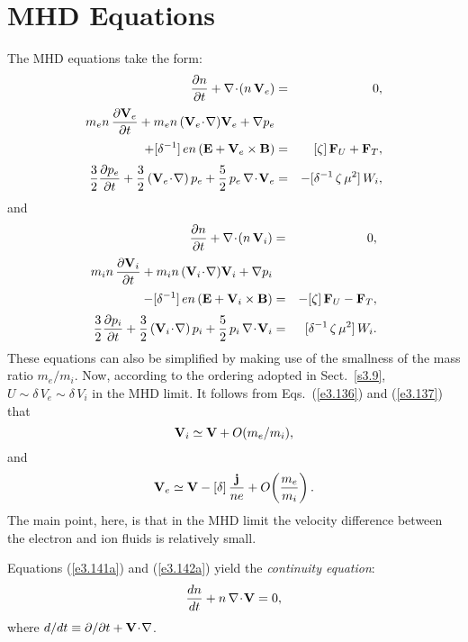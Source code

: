 \section{MHD Equations}
The MHD equations take the form:
\begin{eqnarray}\label{e3.141a}
\frac{\partial n}{\partial t} + \nabla\!\cdot\!(n\,{\bf V}_e) &=& 0,\\[0.5ex]
\label{e3.141b}
m_e n\,\frac{\partial  {\bf V}_e}{\partial t} +
m_e n\,({\bf V}_e\!\cdot\!\nabla){\bf V}_e+
 \nabla p_e\\[0.5ex]
+   [\delta^{-1}]\,e n\,
({\bf E} + {\bf V}_e\times {\bf B})& =& [\zeta]\,{\bf F}_U + {\bf F}_T,
\nonumber\\[0.5ex]\label{e3.141c}
\frac{3}{2}\frac{\partial  p_e}{\partial t} + \frac{3}{2}
 \,({\bf V}_e\!\cdot\!\nabla)\, p_e 
+ \frac{5}{2}\,p_e\,\nabla\!\cdot\!{\bf V}_e
&=& -[\delta^{-1}\,\zeta\,\mu^2]\,W_i,
\end{eqnarray}
and
\begin{eqnarray}\label{e3.142a}
\frac{\partial n}{\partial t} +\nabla\!\cdot\!(n\,{\bf V}_i) &=& 0,\\[0.5ex]
\label{e3.142b}
m_i n\,\frac{\partial  {\bf V}_i}{\partial t} +
m_i n\,({\bf V}_i\!\cdot\!\nabla) {\bf V}_i
+ \nabla p_i \\[0.5ex]
- [\delta^{-1}]\, e n\,
({\bf E} + {\bf V}_i\times {\bf B})& =&- [\zeta]\,{\bf F}_U
-{\bf F}_T,\nonumber\\[0.5ex]
\frac{3}{2}\frac{\partial  p_i}{\partial t} +   \frac{3}{2}
 \,({\bf V}_i\!\cdot\!\nabla) \,p_i +
\frac{5}{2}\,p_i\,\nabla\!\cdot\!{\bf V}_i
 &=&[\delta^{-1}\,\zeta\,\mu^2]\, W_i.\label{e3.142c}
\end{eqnarray}
These equations can also be simplified by making use of the smallness
of the mass ratio $m_e/m_i$. Now, according to the ordering adopted in Sect.~\ref{s3.9},
$U \sim \delta\,V_e\sim \delta\,V_i$ in the MHD limit. It follows from Eqs.~(\ref{e3.136}) and (\ref{e3.137})
that 
\begin{equation}
{\bf V}_i \simeq {\bf V} + O(m_e/m_i),
\end{equation}
and
\begin{equation}
{\bf V}_e \simeq {\bf V} - [\delta]\,\frac{{\bf j}}{ne} + O\!\left(\frac{m_e}
{m_i}\right).
\end{equation}
The main point, here, is that in the MHD limit the velocity difference between
the electron and ion fluids is relatively small. 

Equations (\ref{e3.141a}) and (\ref{e3.142a}) yield the {\em continuity equation}:
\begin{equation}\label{e3.145}
\frac{dn}{dt} + n\, \nabla\!\cdot\!{\bf V} = 0,
\end{equation}
where $d/dt\equiv \partial/\partial t + {\bf V}\!\cdot\!\nabla$. 

